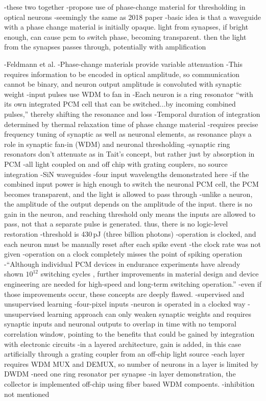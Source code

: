 \cite{chsa2019}
-these two together
-propose use of phase-change material for thresholding in optical neurons
-seemingly the same as 2018 paper
-basic idea is that a waveguide with a phase change material is initially opaque. light from synapses, if bright enough, can cause pcm to switch phase, becoming transparent. then the light from the synapses passes through, potentially with amplification

\cite{feyo2019}
-Feldmann et al.
-Phase-change materials provide variable attenuation
-This requires information to be encoded in optical amplitude, so communication cannot be binary, and neuron output amplitude is convoluted with synaptic weight
-input pulses use WDM to fan in
-Each neuron is a ring resonator ``with its own integrated PCM cell that can be switched...by incoming combined pulses,'' thereby shifting the resonance and loss
-Temporal duration of integration determined by thermal relaxation time of phase change material
-requires precise frequency tuning of synaptic as well as neuronal elements, as resonance plays a role in synaptic fan-in (WDM) and neuronal thresholding
-synaptic ring resonators don't attenuate as in Tait's concept, but rather just by absorption in PCM
-all light coupled on and off chip with grating couplers, no source integration
-SiN waveguides
-four input wavelengths demonstrated here
-if the combined input power is high enough to switch the neuronal PCM cell, the PCM becomes transparent, and the light is allowed to pass through
-unlike a neuron, the amplitude of the output depends on the amplitude of the input. there is no gain in the neuron, and reaching threshold only means the inputs are allowed to pass, not that a separate pulse is generated. thus, there is no logic-level restoration
-threshold is 430\,pJ (three billion photons)
-operation is clocked, and each neuron must be manually reset after each spike event
-the clock rate was not given
-operation on a clock completely misses the point of spiking operation
-``Although individual PCM devices in endurance experiments have already shown $10^{12}$ switching cycles \cite{}, further improvements in material design and device engineering are needed for high-speed and long-term switching operation.''
-even if those improvements occur, these concepts are deeply flawed.
-supervised and unsupervised learning
-four-pixel inputs
-neuron is operated in a clocked way
-unsupervised learning approach can only weaken synaptic weights and requires synaptic inputs and neuronal outputs to overlap in time with no temporal correlation window, pointing to the benefits that could be gained by integration with electronic circuits
-in a layered architecture, gain is added, in this case artificially through a grating coupler from an off-chip light source
-each layer requires WDM MUX and DEMUX, so number of neurons in a layer is limited by DWDM
-need one ring resonator per synapse
-in layer demonstration, the collector is implemented off-chip using fiber based WDM compoents.
-inhibition not mentioned 


